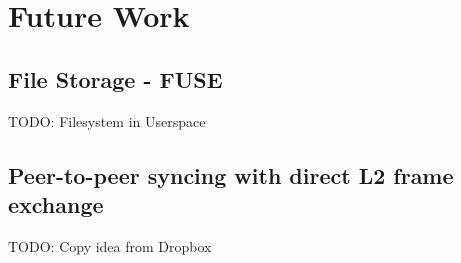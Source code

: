 
\chapter{Future Work}



\section{File Storage - FUSE}
  TODO: Filesystem in Userspace

\section{Peer-to-peer syncing with direct L2 frame exchange}
  TODO: Copy idea from Dropbox